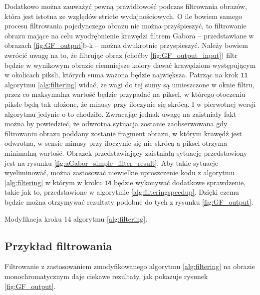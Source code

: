 Dodatkowo można zauważyć pewną prawidłowość podczas filtrowania obrazów, która jest istotna ze względów stricte wydajnościowych. O ile bowiem samego procesu filtrowania pojedynczego obrazu nie można przyśpieszyć, to filtrowanie obrazu mające na celu wyodrębnienie krawędzi filtrem Gabora -- przedstawiane w obrazach \ref{fig:GF_output}b-k -- można dwukrotnie przyspieszyć. Należy bowiem zwrócić uwagę na to, że filtrując obraz (choćby \ref{fig:GF_output_input}) filtr będzie w wynikowym obrazie ciemniejsze kolory dawać krawędziom występującym w okolicach piksli, których suma ważona będzie największa. Patrząc na krok \texttt{11} algorytmu \ref{alg:filtering} widać, że wagi do tej sumy są umieszczone w oknie filtru, przez co maksymalna wartość będzie przypadać na piksel, w którego otoczeniu piksle będą tak ułożone, że minusy przy iloczynie się skrócą. I w pierwotnej wersji algorytmu jedynie o to chodziło. Zwracając jednak uwagę na zaistniały fakt można by powiedzieć, że odwrotna sytuacja zostanie zaobserwowana gdy filtrowaniu obrazu poddany zostanie fragment obrazu, w którym krawędź jest odwrotna, w sensie minusy przy iloczynie się nie skrócą a piksel otrzyma minimalną wartość. Obrazek przedstawiający zaistniałą sytuację przedstawiony jest na rysunku \ref{fig:aGabor_simple_filter_result}. Aby takie sytuacje wyeliminować, można zastosować niewielkie uproszczenie kodu z algorytmu \ref{alg:filtering} w którym w kroku \texttt{14} będzie wykonywać dodatkowe sprawdzenie, takie jak to, przedstawione w algorytmie \ref{alg:filteringspeedup}. Dzięki czemu będzie można otrzymywać rezultaty podobne do tych z rysunku \ref{fig:GF_output}.

\begin{algorithm}
\caption{Modyfikacja kroku 14 algorytmu \ref{alg:filtering}.}
\label{alg:filteringspeedup}

\end{algorithm}


\subsection{Przykład filtrowania}
\label{aGabor_przyklad}

Filtrowanie z zastosowaniem zmodyfikowanego algorytmu \ref{alg:filtering} na obrazie monochromatycznym daje ciekawe rezultaty, jak pokazuje rysunek \ref{fig:GF_output}.

